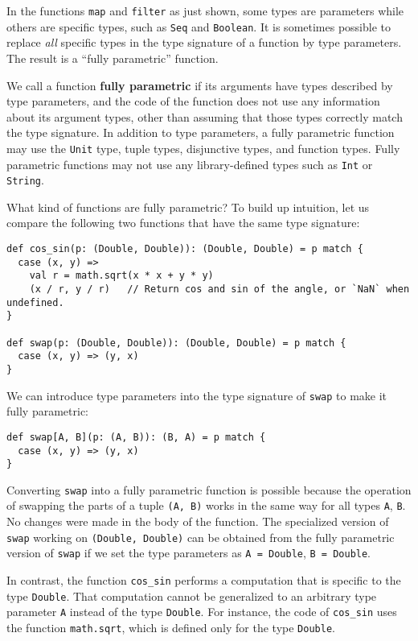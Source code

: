 In the functions \lstinline!map! and \lstinline!filter! as just
shown, some types are parameters while others are specific types,
such as \lstinline!Seq! and \lstinline!Boolean!. It is sometimes
possible to replace \emph{all} specific types in the type signature
of a function by type parameters. The result is a \textsf{``}fully parametric\textsf{''}
function.

We call a function \textbf{fully parametric}
if its arguments have types described by type parameters, and the
code of the function does not use any information about its argument
types, other than assuming that those types correctly match the type
signature. In addition to type parameters, a fully parametric function
may use the \lstinline!Unit! type, tuple types, disjunctive types,
and function types. Fully parametric functions may not use any library-defined
types such as \lstinline!Int! or \lstinline!String!.

What kind of functions are fully parametric? To build up intuition,
let us compare the following two functions that have the same type
signature:
\begin{lstlisting}
def cos_sin(p: (Double, Double)): (Double, Double) = p match {
  case (x, y) =>
    val r = math.sqrt(x * x + y * y)
    (x / r, y / r)   // Return cos and sin of the angle, or `NaN` when undefined.
}

def swap(p: (Double, Double)): (Double, Double) = p match {
  case (x, y) => (y, x)
}
\end{lstlisting}
We can introduce type parameters into the type signature of \lstinline!swap!
to make it fully parametric:
\begin{lstlisting}
def swap[A, B](p: (A, B)): (B, A) = p match {
  case (x, y) => (y, x)
}
\end{lstlisting}
Converting \lstinline!swap! into a fully parametric function is possible
because the operation of swapping the parts of a tuple \lstinline!(A, B)!
works in the same way for all types \lstinline!A!, \lstinline!B!.
No changes were made in the body of the function. The specialized
version of \lstinline!swap! working on \lstinline!(Double, Double)!
can be obtained from the fully parametric version of \lstinline!swap!
if we set the type parameters as \lstinline!A = Double!, \lstinline!B = Double!.

In contrast, the function \lstinline!cos_sin! performs a computation
that is specific to the type \lstinline!Double!. That computation
cannot be generalized to an arbitrary type parameter \lstinline!A!
instead of the type \lstinline!Double!. For instance, the code of
\lstinline!cos_sin! uses the function \lstinline!math.sqrt!, which
is defined only for the type \lstinline!Double!. 

